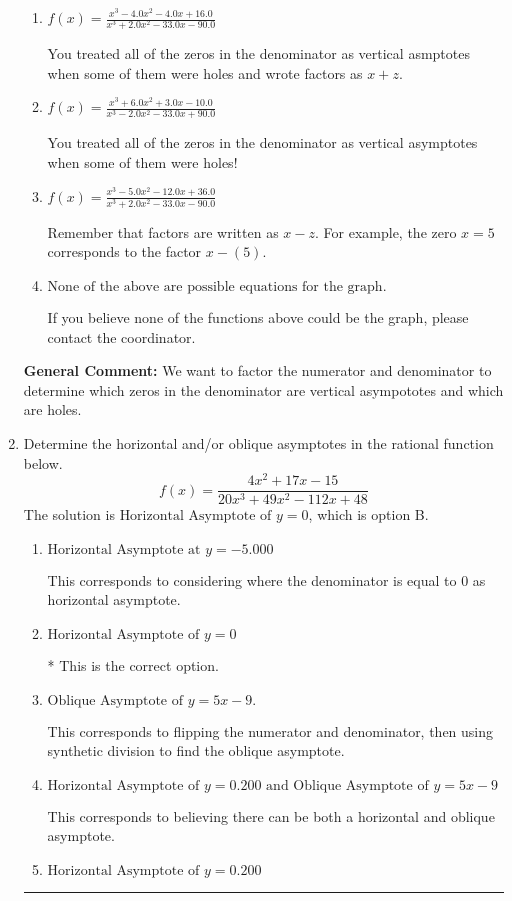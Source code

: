 \documentclass{extbook}[14pt]
\newcommand{\litem}[1]{\item #1

\rule{\textwidth}{0.4pt}}
\begin{document}
\begin{enumerate}
{\begin{enumerate}[label=\Alph*.]
This is the correct answer!
\item \( f(x)=\frac{x^{3} -4.0 x^{2} -4.0 x + 16.0}{x^{3} +2.0 x^{2} -33.0 x -90.0} \)

You treated all of the zeros in the denominator as vertical asmptotes when some of them were holes and wrote factors as $x+z$.
\item \( f(x)=\frac{x^{3} +6.0 x^{2} +3.0 x -10.0}{x^{3} -2.0 x^{2} -33.0 x + 90.0} \)

You treated all of the zeros in the denominator as vertical asymptotes when some of them were holes!
\item \( f(x)=\frac{x^{3} -5.0 x^{2} -12.0 x + 36.0}{x^{3} +2.0 x^{2} -33.0 x -90.0} \)

Remember that factors are written as $x-z$. For example, the zero $x=5$ corresponds to the factor $x-(5)$.
\item \( \text{None of the above are possible equations for the graph.} \)

If you believe none of the functions above could be the graph, please contact the coordinator.
\end{enumerate}

\textbf{General Comment:} We want to factor the numerator and denominator to determine which zeros in the denominator are vertical asympototes and which are holes.
}
\litem{
Determine the horizontal and/or oblique asymptotes in the rational function below.
\[ f(x) = \frac{4x^{2} +17 x -15}{20x^{3} +49 x^{2} -112 x + 48} \]The solution is \( \text{Horizontal Asymptote of } y = 0 \), which is option B.\begin{enumerate}[label=\Alph*.]
\item \( \text{Horizontal Asymptote at } y = -5.000 \)

This corresponds to considering where the denominator is equal to 0 as horizontal asymptote.
\item \( \text{Horizontal Asymptote of } y = 0 \)

* This is the correct option.
\item \( \text{Oblique Asymptote of } y = 5x -9. \)

This corresponds to flipping the numerator and denominator, then using synthetic division to find the oblique asymptote.
\item \( \text{Horizontal Asymptote of } y = 0.200 \text{ and Oblique Asymptote of } y = 5x -9 \)

This corresponds to believing there can be both a horizontal and oblique asymptote.
\item \( \text{Horizontal Asymptote of } y = 0.200  \)


\end{enumerate}}
\end{enumerate}
\end{document}
